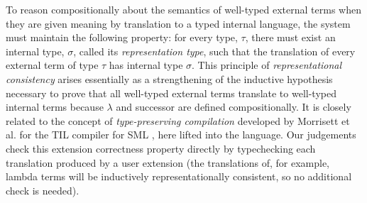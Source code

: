 To reason compositionally about the semantics of well-typed external terms when they are given meaning by translation to a typed internal language, the system must maintain the following property: for every  type, $\tau$, there must exist an internal type, $\sigma$, called its \emph{representation type}, such that the translation of every external term of type $\tau$ has internal type $\sigma$. This principle of \emph{representational consistency} arises essentially as a strengthening of the inductive hypothesis necessary to prove that all well-typed external terms translate to well-typed internal terms because $\lambda$ and successor are defined compositionally. It is closely related to the concept of \emph{type-preserving compilation} developed by Morrisett et al. for the TIL compiler for SML \cite{tarditi+:til-OLD}, here lifted into the language. Our judgements check this extension correctness property directly by typechecking each translation produced by a user extension (the translations of, for example, lambda terms will be inductively representationally consistent, so no additional check is needed).%

